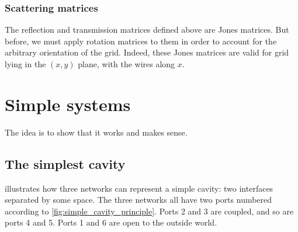 \subsubsection{Scattering matrices}
The reflection and transmission matrices defined above are Jones matrices.
But before, we must apply rotation matrices to them in order to account for the arbitrary orientation of the grid.
Indeed, these Jones matrices are valid for grid lying in the $(x, y)$ plane, with the wires along $x$.







\section{Simple systems}
\label{sec:simple_systems}

The idea is to show that it works and makes sense.




\subsection{The simplest cavity}
\label{sec:the_simplest_cavity}

 illustrates how three networks can represent a simple cavity: two interfaces separated by some space.
The three networks all have two ports numbered according to \cref{fig:simple_cavity_principle}.
Ports 2 and 3 are coupled, and so are ports 4 and 5.
Ports 1 and 6 are open to the outside world.

